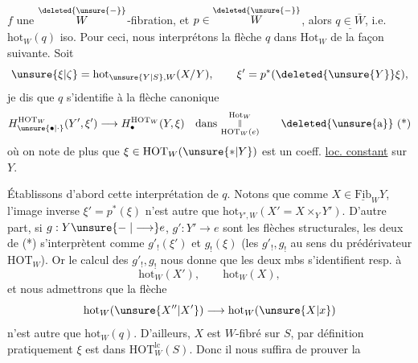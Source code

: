 $f$ une $\overset{\deleted{\unsure{-}}}{W}$-fibration, et $p\in\overset{\deleted{\unsure{-}}}{W}$, alors $\underline{q\in\bar W}$, i.e. $\mathrm{hot}_W(q)$ iso. Pour ceci, nous interprétons la flèche $q$ dans $\mathrm{Hot}_W$  de la façon suivante.
Soit
\[
\unsure{\xi|\zeta}=\mathrm{hot}_{\unsure{Y|S},W}(X/Y),\qquad \xi'=p^*(\deleted{\unsure{Y}}\xi),
\]
je dis que $q$ s'identifie à la flèche canonique
\[
H_{\unsure{\bullet|\cdot}}^{\mathrm{HOT}_W}(Y',\xi')\longrightarrow H_{\bullet}^{\mathrm{HOT}_W}(Y,\xi)\quad\text{dans }\substack{\mathrm{Hot}_W\\ \Vert\\ \mathrm{HOT}_W(e)}\tag*{\deleted{\unsure{a}} (*)}
\]
où on note de plus que $\xi\in\mathrm{HOT}_W(\unsure{*|Y})$ est un coeff. \uline{loc. constant} sur $Y$.

Établissons d'abord cette interprétation de $q$. Notons que comme $X\in\underline{\mathrm{Fib}}_W Y$, l'image inverse $\xi'=p^*(\xi)$ n'est autre que $\mathrm{hot}_{Y',W}(X'=X\times_Y Y')$.
D'autre part, si  $g:Y\unsure{\relbar|\longrightarrow}e$, $g':Y'\longrightarrow e$ sont les flèches structurales, les deux  de (*) s'interprètent  comme $g'_!(\xi')$ et $g_!(\xi)$  (les $g'_!,g_!$ au sens du prédérivateur $\mathrm{HOT}_W$).
Or le calcul des $g'_!,g_!$ nous donne que les deux mbs s'identifient resp. à
\[
\mathrm{hot}_W(X'),\qquad\mathrm{hot}_W(X),
\]
et nous admettrons que la flèche 
\[
\mathrm{hot}_W(\unsure{X''|X'})\longrightarrow\mathrm{hot}_W(\unsure{X|x})
\]
n'est autre que $\mathrm{hot}_W(q)$. D'ailleurs,   $X$ est $W$-fibré sur $S$, par définition pratiquement $\xi$ est dans $\mathrm{HOT}_W^{\mathrm{lc}}(S)$. Donc il nous suffira de prouver la
